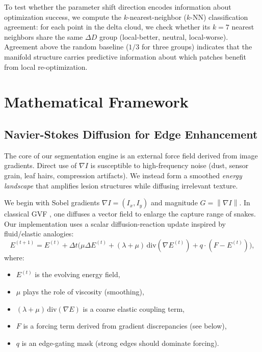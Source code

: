 \documentclass[11pt,a4paper]{article}
\newcommand{\grad}{\nabla}
\newcommand{\lap}{\Delta}
\newcommand{\norm}[1]{\left\lVert #1 \right\rVert}
\begin{document}
To test whether the parameter shift direction encodes information about optimization success, we compute the $k$-nearest-neighbor ($k$-NN) classification agreement: for each point in the delta cloud, we check whether its $k{=}7$ nearest neighbors share the same $\Delta D$ group (local-better, neutral, local-worse). Agreement above the random baseline ($1/3$ for three groups) indicates that the manifold structure carries predictive information about which patches benefit from local re-optimization.

\section{Mathematical Framework}

\subsection{Navier-Stokes Diffusion for Edge Enhancement}
The core of our segmentation engine is an external force field derived from image gradients. Direct use of $\grad I$ is susceptible to high-frequency noise (dust, sensor grain, leaf hairs, compression artifacts). We instead form a smoothed \emph{energy landscape} that amplifies lesion structures while diffusing irrelevant texture.

We begin with Sobel gradients $\grad I = (I_x, I_y)$ and magnitude $G = \norm{\grad I}$. In classical GVF \citep{xu1998gvf}, one diffuses a vector field to enlarge the capture range of snakes. Our implementation uses a scalar diffusion-reaction update inspired by fluid/elastic analogies:
\begin{equation}
E^{(t+1)} = E^{(t)} + \Delta t \Big( \mu \lap E^{(t)} + (\lambda+\mu)\,\mathrm{div}(\grad E^{(t)}) + q\cdot (F - E^{(t)}) \Big),
\label{eq:diffusion_update}
\end{equation}
where:
\begin{itemize}
    \item $E^{(t)}$ is the evolving energy field,
    \item $\mu$ plays the role of viscosity (smoothing),
    \item $(\lambda+\mu)\,\mathrm{div}(\grad E)$ is a coarse elastic coupling term,
    \item $F$ is a forcing term derived from gradient discrepancies (see below),
    \item $q$ is an edge-gating mask (strong edges should dominate forcing).
\end{itemize}
\end{document}
